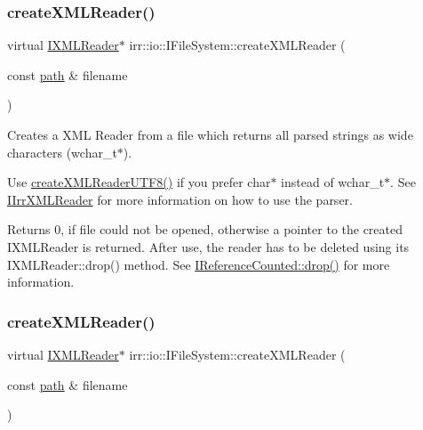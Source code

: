 \subsubsection{\texorpdfstring{create\+X\+M\+L\+Reader()}{createXMLReader()}\hspace{0.1cm}{\footnotesize\ttfamily [1/4]}}
{\footnotesize\ttfamily virtual \hyperlink{namespaceirr_1_1io_ab620b13630f0818f3eefc000f6917fe4}{I\+X\+M\+L\+Reader}$\ast$ irr\+::io\+::\+I\+File\+System\+::create\+X\+M\+L\+Reader (\begin{DoxyParamCaption}\item[{const \hyperlink{namespaceirr_1_1io_a6468281622ce3a1c46b72e19f32dded5}{path} \&}]{filename }\end{DoxyParamCaption})\hspace{0.3cm}{\ttfamily [pure virtual]}}



Creates a X\+ML Reader from a file which returns all parsed strings as wide characters (wchar\+\_\+t$\ast$). 

Use \hyperlink{classirr_1_1io_1_1IFileSystem_affd8f622ac7c3dcd507f20f9cd23b21f}{create\+X\+M\+L\+Reader\+U\+T\+F8()} if you prefer char$\ast$ instead of wchar\+\_\+t$\ast$. See \hyperlink{classirr_1_1io_1_1IIrrXMLReader}{I\+Irr\+X\+M\+L\+Reader} for more information on how to use the parser. \begin{DoxyReturn}{Returns}
0, if file could not be opened, otherwise a pointer to the created I\+X\+M\+L\+Reader is returned. After use, the reader has to be deleted using its I\+X\+M\+L\+Reader\+::drop() method. See \hyperlink{classirr_1_1IReferenceCounted_a03856a09355b89d178090c4a5f738543}{I\+Reference\+Counted\+::drop()} for more information. 
\end{DoxyReturn}
\mbox{\label{classirr_1_1io_1_1IFileSystem_a167c9fa159d16ee5c56c074636b0865e}} 
\subsubsection{\texorpdfstring{create\+X\+M\+L\+Reader()}{createXMLReader()}\hspace{0.1cm}{\footnotesize\ttfamily [2/4]}}
{\footnotesize\ttfamily virtual \hyperlink{namespaceirr_1_1io_ab620b13630f0818f3eefc000f6917fe4}{I\+X\+M\+L\+Reader}$\ast$ irr\+::io\+::\+I\+File\+System\+::create\+X\+M\+L\+Reader (\begin{DoxyParamCaption}\item[{const \hyperlink{namespaceirr_1_1io_a6468281622ce3a1c46b72e19f32dded5}{path} \&}]{filename }\end{DoxyParamCaption})\hspace{0.3cm}{\ttfamily [pure virtual]}}




